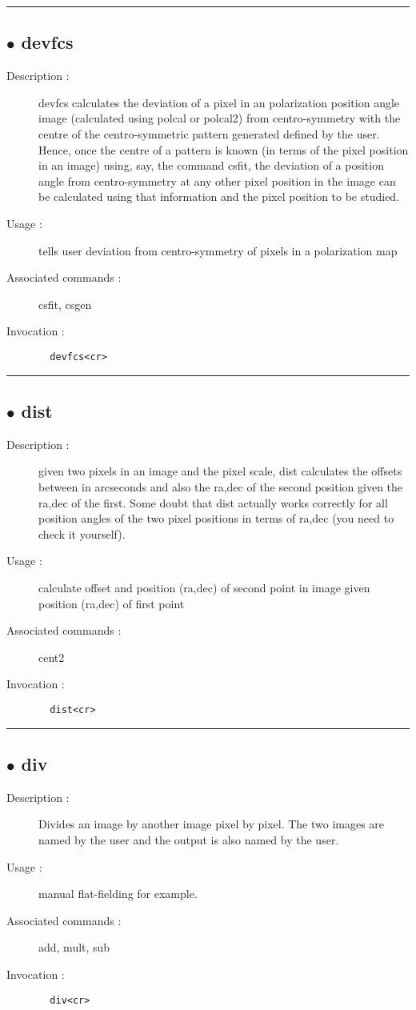 \hrule \subsection*{$\bullet$ devfcs}
\begin{description}
\item[Description :] devfcs calculates the deviation of a pixel in an polarization
position angle image (calculated using polcal or polcal2) from
centro-symmetry with the centre of the centro-symmetric pattern generated
defined by the user.  Hence, once the centre of a pattern is known (in
terms of the pixel position in an image) using, say, the command csfit,
the deviation of a position angle from centro-symmetry at any other pixel
position in the image can be calculated using that information and the
pixel position to be studied.
\item[Usage :] tells user deviation from centro-symmetry of pixels in a
polarization map
\item[Associated commands :] csfit, csgen
\item[Invocation :]

\verb+  devfcs<cr> +\end{description}

\hrule \subsection*{$\bullet$ dist}
\begin{description}
\item[Description :] given two pixels in an image and the pixel scale, dist calculates
the offsets between in arcseconds and also the ra,dec of the second
position given the ra,dec of the first.  Some doubt that dist actually
works correctly for all position angles of the two pixel positions in
terms of ra,dec (you need to check it yourself).
\item[Usage :] calculate offset and position (ra,dec) of second point in image
given position (ra,dec) of first point
\item[Associated commands :] cent2
\item[Invocation :]

\verb+  dist<cr> +\end{description}

\hrule \subsection*{$\bullet$ div}
\begin{description}
\item[Description :] Divides an image by another image pixel by pixel.  The two images
are named by the user and the output is also named by the user.
\item[Usage :] manual flat-fielding for example.
\item[Associated commands :] add, mult, sub
\item[Invocation :]

\verb+  div<cr> +\end{description}

